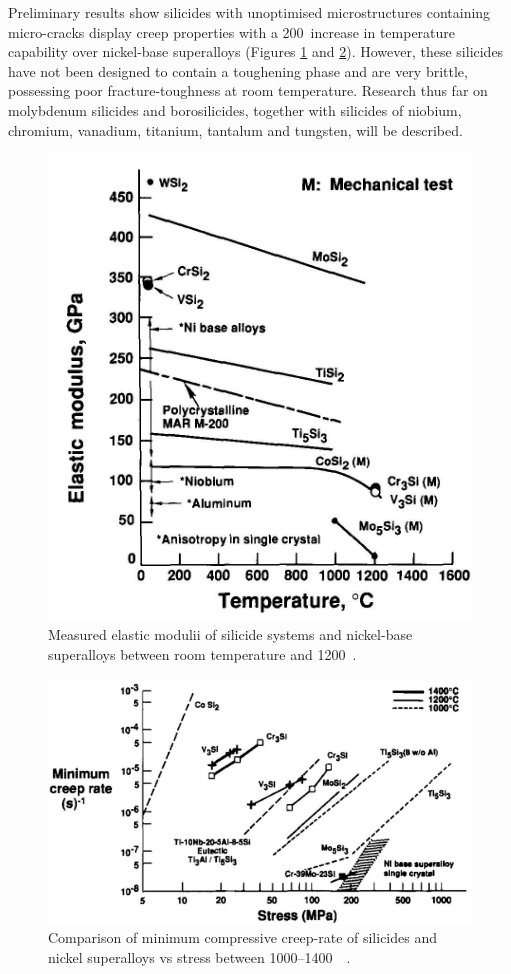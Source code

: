 Preliminary results show silicides with unoptimised microstructures containing micro-cracks display creep properties with a 200\celsius\ increase in temperature capability over nickel-base superalloys (Figures \ref{fig:creepshah92_1} and \ref{fig:creepshah92_2}).  However, these silicides have not been designed to contain a toughening phase and are very brittle, possessing poor fracture-toughness at room temperature.  Research thus far on molybdenum silicides and borosilicides, together with silicides of niobium, chromium, vanadium, titanium, tantalum and tungsten, will be described. 
%
\begin{figure}[H]
\begin{center}
\includegraphics[width=.75\textwidth]{creepshah92_1}
\vspace{-.3cm}
\caption{Measured elastic modulii of silicide systems and nickel-base superalloys between room temperature and 1200\celsius ~\cite{shah92}.}\label{fig:creepshah92_1}
\end{center}
\end{figure}
\vspace{-.5cm}
%
\begin{figure}[H]
\begin{center}
\includegraphics[width=.99\textwidth]{creepshah92_2}
\caption{Comparison of minimum compressive creep-rate of silicides and nickel superalloys vs stress between 1000--1400\celsius\ ~\cite{shah92}.}\label{fig:creepshah92_2}
\end{center}
\end{figure}
